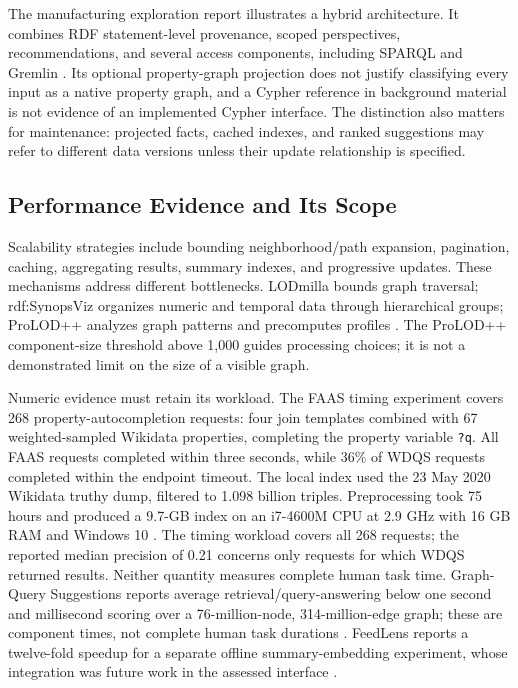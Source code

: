 \documentclass[manuscript,review,screen]{acmart}
\begin{document}
The manufacturing exploration report illustrates a hybrid architecture. It combines RDF statement-level provenance, scoped perspectives, recommendations, and several access components, including SPARQL and Gremlin \citep{V3-00949}. Its optional property-graph projection does not justify classifying every input as a native property graph, and a Cypher reference in background material is not evidence of an implemented Cypher interface. The distinction also matters for maintenance: projected facts, cached indexes, and ranked suggestions may refer to different data versions unless their update relationship is specified.

\subsection{Performance Evidence and Its Scope}
Scalability strategies include bounding neighborhood/path expansion, pagination, caching, aggregating results, summary indexes, and progressive updates. These mechanisms address different bottlenecks. LODmilla bounds graph traversal; rdf:SynopsViz organizes numeric and temporal data through hierarchical groups; ProLOD++ analyzes graph patterns and precomputes profiles \citep{2014_AMA_LODmilla_Shared,2014_Bikakis_rdfSynopsViz_a,V3-01058}. The ProLOD++ component-size threshold above 1,000 guides processing choices; it is not a demonstrated limit on the size of a visible graph.

Numeric evidence must retain its workload. The FAAS timing experiment covers 268 property-autocompletion requests: four join templates combined with 67 weighted-sampled Wikidata properties, completing the property variable \texttt{?q}. All FAAS requests completed within three seconds, while 36\% of WDQS requests completed within the endpoint timeout. The local index used the 23 May 2020 Wikidata truthy dump, filtered to 1.098 billion triples. Preprocessing took 75 hours and produced a 9.7-GB index on an i7-4600M CPU at 2.9 GHz with 16 GB RAM and Windows 10 \citep{2021_Parra_Fast_Approximate}. The timing workload covers all 268 requests; the reported median precision of 0.21 concerns only requests for which WDQS returned results. Neither quantity measures complete human task time. Graph-Query Suggestions reports average retrieval/query-answering below one second and millisecond scoring over a 76-million-node, 314-million-edge graph; these are component times, not complete human task durations \citep{2020_Lissandrini_Graph-Query_Suggestions}. FeedLens reports a twelve-fold speedup for a separate offline summary-embedding experiment, whose integration was future work in the assessed interface \citep{V3-01126}.
\end{document}
